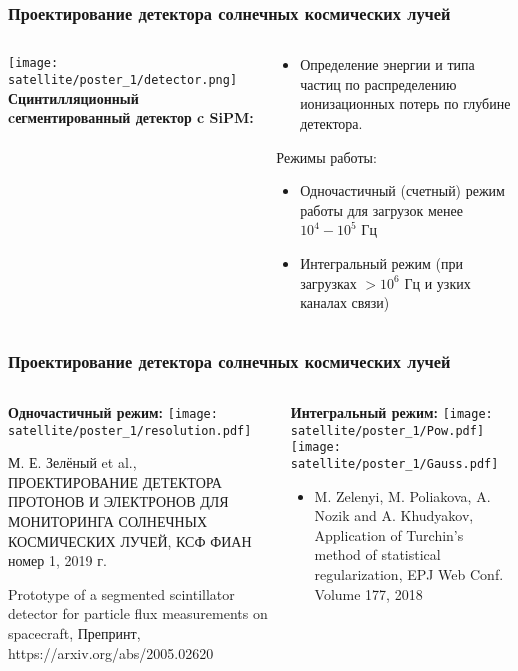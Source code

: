 \begin{frame}
\frametitle{Проектирование детектора солнечных космических лучей}
\begin{columns}
	\begin{column}{0.4\textwidth}
        \texttt{[image: satellite/poster\_1/detector.png]}
		\textbf{Сцинтилляционный cегментированный детектор c SiPM:}
	\end{column}
	\begin{column}{0.6\textwidth}
		\begin{itemize}
			\item Определение энергии и типа частиц по распределению ионизационных потерь по глубине детектора.
		\end{itemize}
    Режимы работы:
    \begin{itemize}
        \item Одночастичный (счетный) режим работы для загрузок менее $10^4 - 10^5$ Гц
        \item Интегральный режим (при загрузках $>10^6$ Гц и узких каналах связи)
    \end{itemize}
%		
	\end{column}
\end{columns} 
\end{frame}


\begin{frame}
\frametitle{Проектирование детектора солнечных космических лучей}
\begin{columns}
    \begin{column}{0.5\textwidth}
        \textbf{Одночастичный режим:}
        \texttt{[image: satellite/poster\_1/resolution.pdf]}
        \begin{itemize}
             \tiny{\item М. Е. Зелёный et al., ПРОЕКТИРОВАНИЕ ДЕТЕКТОРА ПРОТОНОВ И ЭЛЕКТРОНОВ ДЛЯ МОНИТОРИНГА СОЛНЕЧНЫХ КОСМИЧЕСКИХ ЛУЧЕЙ, КСФ ФИАН номер 1, 2019 г.}
            \item \tiny{Prototype of a segmented scintillator detector for particle flux measurements on spacecraft, Препринт, https://arxiv.org/abs/2005.02620}
        \end{itemize}
        
        
   
    \end{column}
    \begin{column}{0.5\textwidth}
        \textbf{Интегральный режим:}
        \texttt{[image: satellite/poster\_1/Pow.pdf]}
        \texttt{[image: satellite/poster\_1/Gauss.pdf]}
             \tiny{   \begin{itemize}
            \item 	M. Zelenyi, M. Poliakova, A. Nozik and A. Khudyakov, Application of Turchin's method of statistical regularization, EPJ Web Conf. Volume 177, 2018
        \end{itemize}}	
    \end{column}
\end{columns} 
\end{frame}


